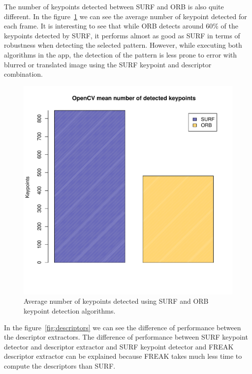 The number of keypoints detected between SURF and ORB is also quite different. In
the figure~\ref{fig:numberkp} we can see the average number of keypoint detected for
each frame. It is interesting to see that while ORB detects around 60\% of the
keypoints detected by SURF, it performs almost as good as SURF in terms of
robustness when detecting the selected pattern. However, while executing both
algorithms in the app, the detection of the pattern is less prone to error with
blurred or translated image using the SURF keypoint and descriptor combination. 

\begin{figure}
\centering
\includegraphics[scale=0.75]{performance/keypoints-number.pdf}
\caption{\label{fig:numberkp} Average number of keypoints detected using SURF and
  ORB keypoint detection algorithms.}
\end{figure} 

In the figure~\ref{fig:descriptors} we can see the difference of performance between
the descriptor extractors. The difference of performance between SURF keypoint
detector and descriptor extractor and SURF keypoint detector and FREAK descriptor
extractor can be explained because FREAK takes much less time to compute the
descriptors than SURF.

